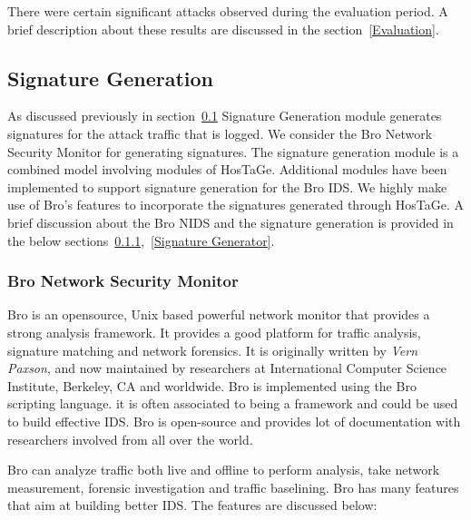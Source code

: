 \documentclass[article,msc=informatik,type=msc,colorback,accentcolor=tud9c]{tudthesis}
\begin{document}
	\vspace{3mm}
	
	There were certain significant attacks observed during the evaluation period. A brief description about these results are discussed in the section~\ref{Evaluation}. 
	
	
	\vspace{3mm} 
	\subsection{Signature Generation}\label{Signature Generation Module}
		As discussed previously in section~\ref{Signature Generation Module}  Signature Generation module generates signatures for the attack traffic that is logged. We consider the Bro Network Security Monitor for generating signatures. The signature generation module is a combined model involving modules of HosTaGe. Additional modules have been implemented to support signature generation for the Bro \ac{IDS}. We highly make use of Bro's features to incorporate the signatures generated through HosTaGe. A brief discussion about the Bro \ac{NIDS} and the signature generation is provided in the below sections~\ref{Bro Network Security Monitor},~\ref{Signature Generator}.
		
		
		\vspace{3mm}
		\subsubsection{Bro Network Security Monitor}\label{Bro Network Security Monitor}
		Bro is an opensource, Unix based powerful network monitor that provides a strong analysis framework.  It provides a good platform for traffic analysis, signature matching and network forensics. It is originally written by \textit{Vern Paxson}, and now maintained by researchers at International Computer Science Institute, Berkeley, CA and worldwide.  
		Bro is implemented using the Bro scripting language. it is often associated to being a framework and could be used to build effective \ac{IDS}. Bro is open-source and provides lot of documentation with researchers involved from all over the world. 
		
		
		Bro can analyze traffic both live and offline to perform analysis, take network measurement, forensic investigation and traffic baselining.		
		Bro has many features that aim at building better IDS. The features are discussed below:
		
\end{document}
